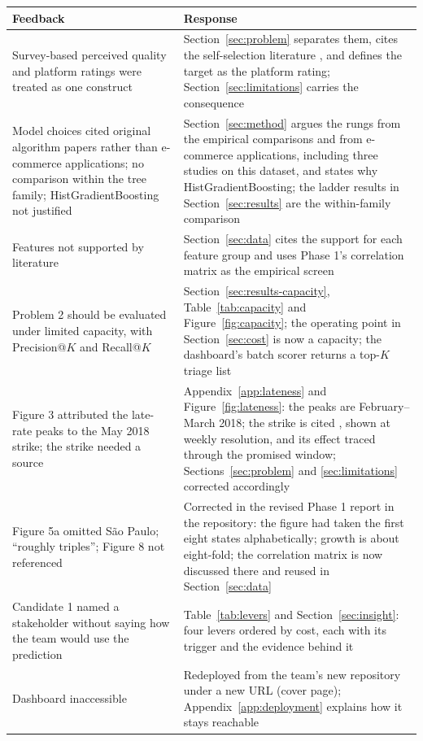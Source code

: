 \begin{center}
\begin{minipage}{\linewidth}
\centering
{}
\label{tab:feedback}
\small
\begin{tabular}{@{}p{4.4cm}p{10.1cm}@{}}
\toprule
\textbf{Feedback} & \textbf{Response} \\
\midrule
Survey-based perceived quality and platform ratings were treated as one construct &
Section~\ref{sec:problem} separates them, cites the self-selection literature
\citep{hu2009jshaped, hu2017selfselection, dellarocas2003digitization}, and
defines the target as the platform rating; Section~\ref{sec:limitations}
carries the consequence \\[2pt]
Model choices cited original algorithm papers rather than e-commerce
applications; no comparison within the tree family; HistGradientBoosting not
justified &
Section~\ref{sec:method} argues the rungs from the empirical comparisons and
from e-commerce applications, including three studies on this dataset, and
states why HistGradientBoosting; the ladder results in Section~\ref{sec:results}
are the within-family comparison \\[2pt]
Features not supported by literature &
Section~\ref{sec:data} cites the support for each feature group and uses
Phase 1's correlation matrix as the empirical screen \\[2pt]
Problem 2 should be evaluated under limited capacity, with Precision@$K$ and
Recall@$K$ &
Section~\ref{sec:results-capacity}, Table~\ref{tab:capacity} and
Figure~\ref{fig:capacity}; the operating point in Section~\ref{sec:cost} is now
a capacity; the dashboard's batch scorer returns a top-$K$ triage list \\[2pt]
Figure 3 attributed the late-rate peaks to the May 2018 strike; the strike
needed a source &
Appendix~\ref{app:lateness} and Figure~\ref{fig:lateness}: the peaks are
February--March 2018; the strike is cited \citep{bloomberg2018strike,
tecnoblog2018correios}, shown at weekly resolution, and its effect traced
through the promised window; Sections~\ref{sec:problem} and
\ref{sec:limitations} corrected accordingly \\[2pt]
Figure 5a omitted S\~{a}o Paulo; ``roughly triples''; Figure 8 not referenced &
Corrected in the revised Phase 1 report in the repository: the figure had taken
the first eight states alphabetically; growth is about eight-fold; the
correlation matrix is now discussed there and reused in Section~\ref{sec:data} \\[2pt]
Candidate 1 named a stakeholder without saying how the team would use the
prediction &
Table~\ref{tab:levers} and Section~\ref{sec:insight}: four levers ordered by
cost, each with its trigger and the evidence behind it \\[2pt]
Dashboard inaccessible &
Redeployed from the team's new repository under a new URL (cover page);
Appendix~\ref{app:deployment} explains how it stays reachable \\
\bottomrule
\end{tabular}
\end{minipage}
\end{center}

